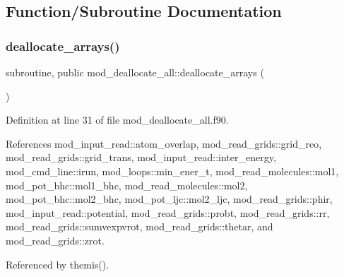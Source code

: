 \subsection{Function/\+Subroutine Documentation}
\mbox{\label{namespacemod__deallocate__all_a03994854d5404353882da36b59ca3098}} 
\subsubsection{\texorpdfstring{deallocate\+\_\+arrays()}{deallocate\_arrays()}}
{\footnotesize\ttfamily subroutine, public mod\+\_\+deallocate\+\_\+all\+::deallocate\+\_\+arrays (\begin{DoxyParamCaption}{ }\end{DoxyParamCaption})}



Definition at line 31 of file mod\+\_\+deallocate\+\_\+all.\+f90.



References mod\+\_\+input\+\_\+read\+::atom\+\_\+overlap, mod\+\_\+read\+\_\+grids\+::grid\+\_\+reo, mod\+\_\+read\+\_\+grids\+::grid\+\_\+trans, mod\+\_\+input\+\_\+read\+::inter\+\_\+energy, mod\+\_\+cmd\+\_\+line\+::irun, mod\+\_\+loops\+::min\+\_\+ener\+\_\+t, mod\+\_\+read\+\_\+molecules\+::mol1, mod\+\_\+pot\+\_\+bhc\+::mol1\+\_\+bhc, mod\+\_\+read\+\_\+molecules\+::mol2, mod\+\_\+pot\+\_\+bhc\+::mol2\+\_\+bhc, mod\+\_\+pot\+\_\+ljc\+::mol2\+\_\+ljc, mod\+\_\+read\+\_\+grids\+::phir, mod\+\_\+input\+\_\+read\+::potential, mod\+\_\+read\+\_\+grids\+::probt, mod\+\_\+read\+\_\+grids\+::rr, mod\+\_\+read\+\_\+grids\+::sumvexpvrot, mod\+\_\+read\+\_\+grids\+::thetar, and mod\+\_\+read\+\_\+grids\+::zrot.



Referenced by themis().

